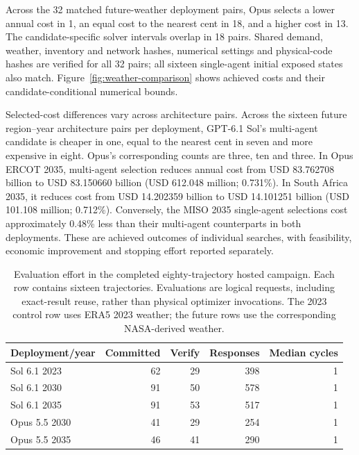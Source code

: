 \documentclass[pdflatex,sn-nature]{sn-jnl}
\begin{document}
\begin{appendices}
Across the 32 matched future-weather deployment pairs, Opus selects a lower annual cost in 1, an equal cost to the nearest cent in 18, and a higher cost in 13. The candidate-specific solver intervals overlap in 18 pairs. Shared demand, weather, inventory and network hashes, numerical settings and physical-code hashes are verified for all 32 pairs; all sixteen single-agent initial exposed states also match. Figure~\ref{fig:weather-comparison} shows achieved costs and their candidate-conditional numerical bounds.

Selected-cost differences vary across architecture pairs. Across the sixteen future region--year architecture pairs per deployment, GPT-6.1 Sol's multi-agent candidate is cheaper in one, equal to the nearest cent in seven and more expensive in eight. Opus's corresponding counts are three, ten and three. In Opus ERCOT 2035, multi-agent selection reduces annual cost from USD 83.762708 billion to USD 83.150660 billion (USD 612.048 million; 0.731\%). In South Africa 2035, it reduces cost from USD 14.202359 billion to USD 14.101251 billion (USD 101.108 million; 0.712\%). Conversely, the MISO 2035 single-agent selections cost approximately 0.48\% less than their multi-agent counterparts in both deployments. These are achieved outcomes of individual searches, with feasibility, economic improvement and stopping effort reported separately.

\begin{table}[tbp]
\caption{Evaluation effort in the completed eighty-trajectory hosted campaign. Each row contains sixteen trajectories. Evaluations are logical requests, including exact-result reuse, rather than physical optimizer invocations. The 2023 control row uses ERA5 2023 weather; the future rows use the corresponding NASA-derived weather.}
\label{tab:weather-effort}
\centering\small
\begingroup\setlength{\tabcolsep}{4pt}
\begin{tabular}{@{}lrrrr@{}}
\toprule
Deployment/year & Committed & Verify & Responses & Median cycles\\
\midrule
Sol 6.1 2023 & 62 & 29 & 398 & 1\\
Sol 6.1 2030 & 91 & 50 & 578 & 1\\
Sol 6.1 2035 & 91 & 53 & 517 & 1\\
Opus 5.5 2030 & 41 & 29 & 254 & 1\\
Opus 5.5 2035 & 46 & 41 & 290 & 1\\
\bottomrule
\end{tabular}
\endgroup
\end{table}


\end{appendices}
\end{document}
